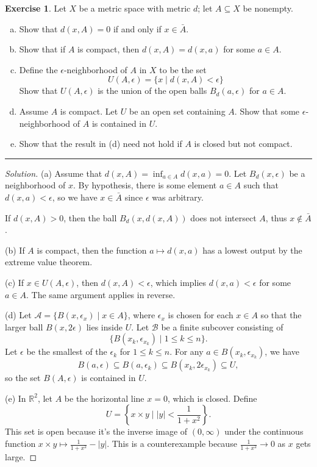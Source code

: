 \documentclass{article}
\theoremstyle{definition}
\newtheorem{exercise}{Exercise}[section]
\begin{document}
\begin{exercise}
  Let $X$ be a metric space with metric $d$; let $A\subseteq X$ be nonempty.
  \begin{enumerate}[(a)]
    \item Show that $d(x,A) = 0$ if and only if $x\in \bar{A}$.
    \item Show that if $A$ is compact, then $d(x,A) = d(x,a)$ for some $a\in A$.
    \item Define the $\epsilon$-neighborhood of $A$ in $X$ to be the set
    $$U(A,\epsilon) = \{x\mid d(x,A) < \epsilon\}$$
    Show that $U(A,\epsilon)$ is the union of the open balls $B_d(a,\epsilon)$ for $a\in A$.
    \item Assume $A$ is compact. Let $U$ be an open set containing $A$. Show that some $\epsilon$-neighborhood of $A$ is contained in $U$.
    \item Show that the result in (d) need not hold if $A$ is closed but not compact.
  \end{enumerate}
\end{exercise}
\hrule
\begin{proof}[Solution]
  (a) Assume that $d(x,A) = \inf_{a\in A} d(x,a) = 0$. Let $B_d(x,\epsilon)$ be a neighborhood of $x$. By hypothesis, there is some element $a\in A$ such that $d(x,a) < \epsilon$, so we have $x\in \bar{A}$ since $\epsilon$ was arbitrary.

  If $d(x,A) > 0$, then the ball $B_d(x,d(x,A))$ does not intersect $A$, thus $x\notin\bar{A}$.

\vspace{0.5em}
  (b) If $A$ is compact, then the function $a\mapsto d(x,a)$ has a lowest output by the extreme value theorem.

\vspace{0.5em}
  (c) If $x\in U(A,\epsilon)$, then $d(x,A) < \epsilon$, which implies $d(x,a) < \epsilon$ for some $a\in A$. The same argument applies in reverse.

  \vspace{0.5em}
  (d) Let $\mathcal{A} = \{B(x,\epsilon_x)\mid x\in A\}$, where $\epsilon_x$ is chosen for each $x\in A$ so that the larger ball $B(x,2\epsilon)$ lies inside $U$. Let $\mathcal{B}$ be a finite subcover consisting of
  $$\{B(x_k,\epsilon_{x_k})\mid 1\le k\le n\}.$$
  Let $\epsilon$ be the smallest of the $\epsilon_k$ for $1\le k\le n$. For any $a\in B(x_k, \epsilon_{x_k})$, we have
  $$B(a,\epsilon)\subseteq B(a, \epsilon_k) \subseteq B(x_k, 2\epsilon_{x_k})\subseteq U,$$
  so the set $B(A, \epsilon)$ is contained in $U$.

  \vspace{0.5em}
  (e) In $\mathbb{R}^2$, let $A$ be the horizontal line $x = 0$, which is closed. Define
  $$U = \left\{x\times y\mid |y| < \frac{1}{1+x^2}\right\}.$$
  This set is open because it's the inverse image of $(0,\infty)$ under the continuous function $x\times y\mapsto \frac{1}{1+x^2} - |y|$. This is a counterexample because $\frac{1}{1+x^2}\to 0$ as $x$ gets large.
\end{proof}
\end{document}
